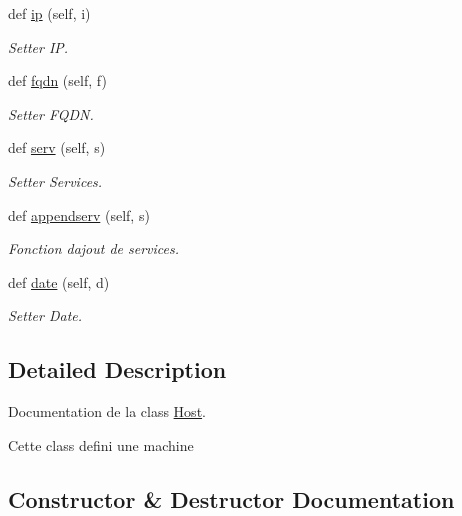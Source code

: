 \begin{DoxyCompactItemize}
def \hyperlink{classscan__without__thread_1_1Host_a98aba57c7d75d3ea42b43b9260bcf388}{ip} (self, i)
\begin{DoxyCompactList}\small\item\em Setter IP. \end{DoxyCompactList}\item 
def \hyperlink{classscan__without__thread_1_1Host_ae71ed46288fcc1e3784324227478700b}{fqdn} (self, f)
\begin{DoxyCompactList}\small\item\em Setter F\+Q\+DN. \end{DoxyCompactList}\item 
def \hyperlink{classscan__without__thread_1_1Host_a3fc58e338857c5ba6e4725b90a538266}{serv} (self, s)
\begin{DoxyCompactList}\small\item\em Setter Services. \end{DoxyCompactList}\item 
def \hyperlink{classscan__without__thread_1_1Host_ac10ad05ee73fee33054ec53f2167d63d}{appendserv} (self, s)
\begin{DoxyCompactList}\small\item\em Fonction d\textquotesingle{}ajout de services. \end{DoxyCompactList}\item 
def \hyperlink{classscan__without__thread_1_1Host_a82dddd1ba57f1f790b16c1618753f59e}{date} (self, d)
\begin{DoxyCompactList}\small\item\em Setter Date. \end{DoxyCompactList}\end{DoxyCompactItemize}


\subsection{Detailed Description}
Documentation de la class \hyperlink{classscan__without__thread_1_1Host}{Host}. 

Cette class defini une machine 

\subsection{Constructor \& Destructor Documentation}
\hypertarget{classscan__without__thread_1_1Host_a35bd0879168bd31fdb6385c45c7ba901}{}\label{classscan__without__thread_1_1Host_a35bd0879168bd31fdb6385c45c7ba901} 
